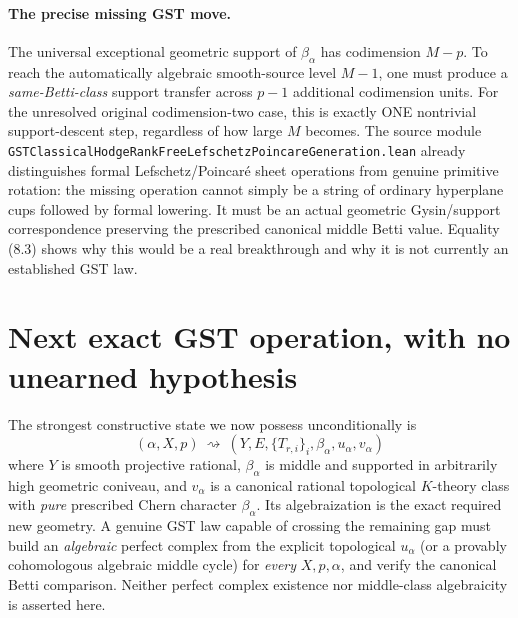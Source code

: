 \documentclass[11pt]{article}
\begin{document}
\paragraph{The precise missing GST move.}
The universal exceptional geometric
support of \(\beta_\alpha\)
has codimension \(M-p\).
To reach the automatically
algebraic smooth-source level
\(M-1\), one must produce a
\emph{same-Betti-class}
support transfer across \(p-1\)
additional codimension units.
For the unresolved original
codimension-two case, this
is exactly ONE nontrivial
support-descent step, regardless
of how large \(M\) becomes.
The source module
\texttt{GSTClassicalHodgeRankFreeLefschetzPoincareGeneration.lean}
already distinguishes formal
Lefschetz/Poincaré sheet operations
from genuine primitive rotation:
the missing operation cannot
simply be a string of ordinary
hyperplane cups followed by
formal lowering. It must be
an actual geometric Gysin/support
correspondence preserving the
prescribed canonical middle
Betti value. Equality (8.3)
shows why this would be a real
breakthrough and why it is not
currently an established GST law.

\section{Next exact GST operation, with no unearned hypothesis}
The strongest constructive state we
now possess unconditionally is
\[
 (\alpha,X,p)\ \rightsquigarrow\
 (Y,E,\{T_{r,i}\}_i,\beta_\alpha,u_\alpha,v_\alpha)
\]
where \(Y\) is smooth projective rational,
\(\beta_\alpha\) is middle and supported
in arbitrarily high geometric coniveau,
and \(v_\alpha\) is a canonical
rational topological \(K\)-theory class
with \emph{pure} prescribed Chern
character \(\beta_\alpha\).
Its algebraization is the exact
required new geometry. A genuine GST
law capable of crossing the remaining
gap must build an \emph{algebraic}
perfect complex from the explicit
topological \(u_\alpha\) (or a
provably cohomologous algebraic
middle cycle) for \emph{every}
\(X,p,\alpha\), and verify the canonical
Betti comparison. Neither perfect
complex existence nor middle-class
algebraicity is asserted here.
\end{document}
